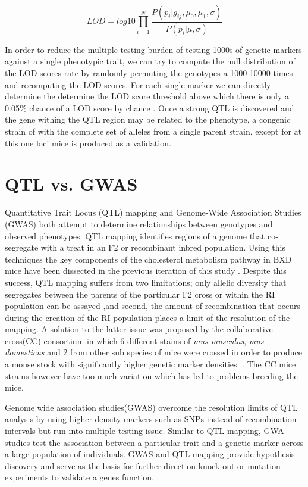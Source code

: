 \documentclass[a4paper,11pt,twoside]{book}
\begin{document}
	$$LOD = log10\prod_{i=1}^{N}\dfrac{P(p_i| g_{ij},\mu_0,\mu_1,\sigma )}{P(p_i|\mu,\sigma) } $$
	
	In order to reduce the multiple testing burden of testing 1000s of genetic markers against a single phenotypic trait, we can try to compute the null distribution of the LOD scores rate by randomly permuting the genotypes a 1000-10000 times and recomputing the LOD scores. For each single marker we can directly determine the determine the LOD score threshold above which there is only a 0.05\% chance of a LOD score by chance  \citep{Broman2009AR/qtl}. Once a strong QTL is discovered and the gene withing the QTL region may be related to the phenotype, a congenic strain of with the complete set of alleles from a single parent strain, except for at this one loci mice is produced as a validation. 
	
	\section{QTL vs. GWAS}
	
	Quantitative Trait Locus (QTL) mapping and Genome-Wide Association Studies (GWAS) both attempt to determine relationships between genotypes and observed phenotypes. QTL mapping identifies regions of a genome that co-segregate with a treat in an F2 or recombinant inbred population. Using this techniques the key components of the cholesterol metabolism pathway in BXD mice have been dissected in the previous iteration of this study \citep{Williams2016SystemsFunction}. Despite this success, QTL mapping suffers from two limitations; only allelic diversity that segregates between the parents of the particular F2 cross or within the RI population can be assayed ,and second, the amount of recombination that occurs during the creation of the RI population places a limit of the resolution of the mapping\citep{Williams2017ResourcesGenetics}. A solution to the latter issue was proposed by the collaborative cross(CC) consortium in which 6 different stains of \textit{mus musculus}, \textit{mus domesticus} and 2 from other sub species of mice were crossed in order to produce a mouse stock with significantly higher genetic marker densities. \citep{CollaborativeCrossConsortium2012ThePopulation.}. The CC mice strains however have too much variation which has led to problems breeding the mice.
	
		Genome wide association studies(GWAS) overcome the resolution limits of QTL analysis by using higher density markers such as SNPs instead of recombination intervals but run into multiple testing issue. Similar to QTL mapping, GWA studies test the association between a particular trait and a genetic marker across a large population of individuals. GWAS and QTL mapping provide hypothesis discovery and serve as the basis for further direction knock-out or mutation experiments to validate a genes function. 
	
\end{document}

